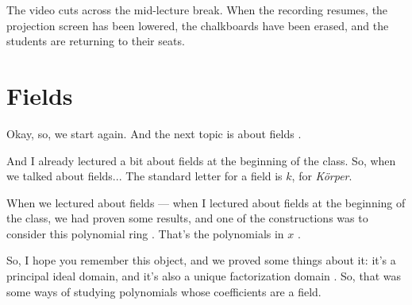 \begin{pause}
The video cuts across the mid-lecture break. When the recording resumes, the projection screen has been lowered, the chalkboards have been erased, and the students are returning to their seats.
\end{pause}

\section{Fields}

\begin{speech}[00:47:27 - 00:48:29]
Okay, so, we start again. And the next topic is about fields .

And I already lectured a bit about fields at the beginning of the class. So, when we talked about fields...  The standard letter for a field is $k$, for \emph{Körper}.

When we lectured about fields --- when I lectured about fields at the beginning of the class, we had proven some results, and one of the constructions was to consider this polynomial ring . That's the polynomials in $x$ .

So, I hope you remember this object, and we proved some things about it: it's a principal ideal domain, and it's also a unique factorization domain . So, that was some ways of studying polynomials whose coefficients are a field.
\end{speech}

